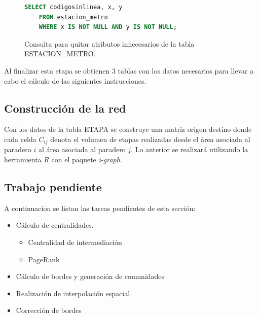\documentclass[12pt]{article}
\begin{document}
\begin{figure}[H]
\begin{center}
\begin{lstlisting}[breaklines=true, language=SQL]
	SELECT codigosinlinea, x, y  
	FROM estacion_metro
	WHERE x IS NOT NULL AND y IS NOT NULL;
\end{lstlisting}
\end{center}
\caption{Consulta para quitar atributos innecesarios de la tabla ESTACION\_METRO.}
\label{fig:limpiar_datos_estacion_metro}
\end{figure}	

Al finalizar esta etapa se obtienen 3 tablas con los datos necesarios para llevar a cabo el cálculo de las siguientes instrucciones.

	\subsection{Construcción de la red}
	
Con los datos de la tabla ETAPA se construye una matriz origen destino donde cada celda $C_{ij}$ denota el volumen de etapas realizadas desde el área asociada al paradero $i$ al área asociada al paradero $j$. Lo anterior se realizará utilizando la herramienta $R$ con el paquete \textit{i-graph}.


    \subsection{Trabajo pendiente}
    
    A continuacion se listan las tareas pendientes de esta sección:
    
    \begin{itemize}
    	\item	Cálculo de centralidades.
    		\begin{itemize}
    			\item Centralidad de intermediación
    			\item PageRank
    		\end{itemize}
    	\item Cálculo de bordes y generación de comunidades
    	\item Realización de interpolación espacial
    	\item Corrección de bordes
    \end{itemize}
    
\end{document}

